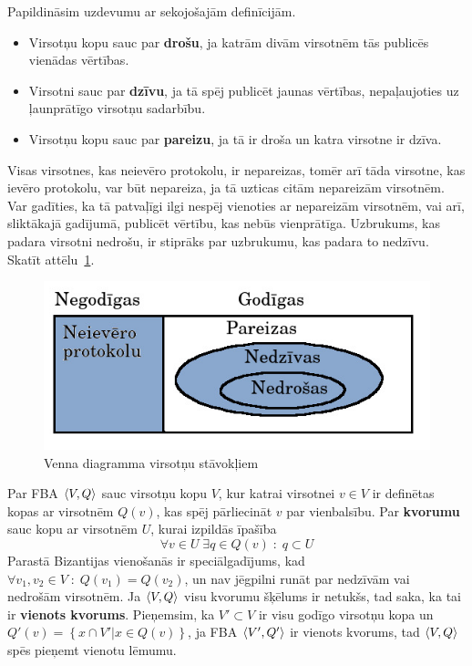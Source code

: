 Papildināsim uzdevumu ar sekojošajām definīcijām.
\begin{itemize}
    \item Virsotņu kopu sauc par \textbf{drošu}, ja katrām divām virsotnēm tās publicēs vienādas vērtības.
    \item Virsotni sauc par \textbf{dzīvu}, ja tā spēj publicēt jaunas vērtības, nepaļaujoties uz ļaunprātīgo virsotņu sadarbību.
    \item Virsotņu kopu sauc par \textbf{pareizu}, ja tā ir droša un katra virsotne ir dzīva.
\end{itemize}
Visas virsotnes, kas neievēro protokolu, ir nepareizas, tomēr arī tāda virsotne, kas ievēro protokolu, var būt nepareiza, ja tā uzticas citām nepareizām virsotnēm. Var gadīties, ka tā patvaļīgi ilgi nespēj vienoties ar nepareizām virsotnēm, vai arī, sliktākajā gadījumā, publicēt vērtību, kas nebūs vienprātīga. Uzbrukums, kas padara virsotni nedrošu, ir stiprāks par uzbrukumu, kas padara to nedzīvu. Skatīt attēlu~\ref{fig:node-fail}.
\begin{figure}[htpb]
    \centering
    \includegraphics[scale=0.5]{teorija/node-fail.jpg}
    \caption{Venna diagramma virsotņu stāvokļiem}
\label{fig:node-fail}
\end{figure}

Par FBA $\langle V,Q \rangle$ sauc virsotņu kopu $V$, kur katrai virsotnei $v\in V$ ir definētas kopas ar virsotnēm $Q(v)$, kas spēj pārliecināt $v$ par vienbalsību. Par \textbf{kvorumu} sauc kopu ar virsotnēm $U$, kurai izpildās īpašība
\begin{equation*}
    \forall v \in U \;\exists q \in Q(v) \;:\; q \subset U
\end{equation*}
Parastā Bizantijas vienošanās ir speciālgadījums, kad $\forall v_1,v_2\in V \;:\; Q(v_1) = Q(v_2)$, un nav jēgpilni runāt par nedzīvām vai nedrošām virsotnēm.
Ja $\langle V,Q \rangle$ visu kvorumu šķēlums ir netukšs, tad saka, ka tai ir \textbf{vienots kvorums}. Pieņemsim, ka $V'\subset V$ ir visu godīgo virsotņu kopa un $Q'(v) = \left\{ x\cap V' | x\in Q(v) \right\}$, ja FBA $\langle V',Q' \rangle$ ir vienots kvorums, tad $\langle V,Q \rangle$ spēs pieņemt vienotu lēmumu.\cite{mazieres15}

